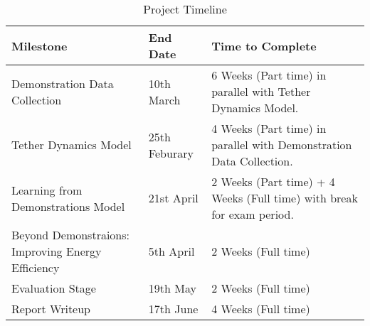 \begin{table}[h]
  \centering
  \begin{tabular}{|p{5cm}|p{3cm}|p{6cm}|}

  \hline
  Milestone & End Date & Time to Complete \\ \hline
  Demonstration Data Collection    & 
  10th March      & 
  6 Weeks (Part time) in parallel with Tether Dynamics Model.        \\ \hline

  Tether Dynamics Model  & 
  25th Feburary      & 
  4 Weeks (Part time) in parallel with Demonstration Data Collection.      \\ \hline

  Learning from Demonstrations Model    & 
  21st April      & 
  2 Weeks (Part time) + 4 Weeks (Full time) with break for exam period.        \\ \hline

  Beyond Demonstraions: Improving Energy Efficiency    & 
  5th April      & 
  2 Weeks (Full time)        \\ \hline

  Evaluation Stage    & 
  19th May      & 
  2 Weeks (Full time)        \\ \hline

  Report Writeup    & 
  17th June      & 
  4 Weeks (Full time)        \\ \hline
  \end{tabular}
  \caption{Project Timeline}
  \label{table:project-timeline}
\end{table}